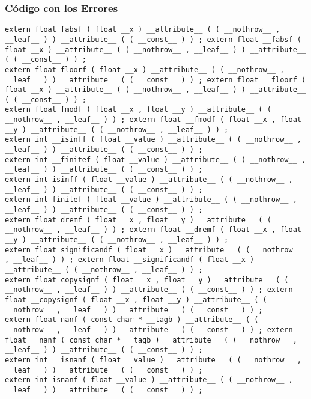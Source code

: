 \documentclass{beamer}
\begin{document}
\begin{frame}[fragile]
\frametitle{C\'odigo con los Errores}
\begin{verbatim}
extern float fabsf ( float __x ) __attribute__ ( ( __nothrow__ , __leaf__ ) ) __attribute__ ( ( __const__ ) ) ; extern float __fabsf ( float __x ) __attribute__ ( ( __nothrow__ , __leaf__ ) ) __attribute__ ( ( __const__ ) ) ; 
extern float floorf ( float __x ) __attribute__ ( ( __nothrow__ , __leaf__ ) ) __attribute__ ( ( __const__ ) ) ; extern float __floorf ( float __x ) __attribute__ ( ( __nothrow__ , __leaf__ ) ) __attribute__ ( ( __const__ ) ) ; 
extern float fmodf ( float __x , float __y ) __attribute__ ( ( __nothrow__ , __leaf__ ) ) ; extern float __fmodf ( float __x , float __y ) __attribute__ ( ( __nothrow__ , __leaf__ ) ) ; 
extern int __isinff ( float __value ) __attribute__ ( ( __nothrow__ , __leaf__ ) ) __attribute__ ( ( __const__ ) ) ; 
extern int __finitef ( float __value ) __attribute__ ( ( __nothrow__ , __leaf__ ) ) __attribute__ ( ( __const__ ) ) ; 
extern int isinff ( float __value ) __attribute__ ( ( __nothrow__ , __leaf__ ) ) __attribute__ ( ( __const__ ) ) ; 
extern int finitef ( float __value ) __attribute__ ( ( __nothrow__ , __leaf__ ) ) __attribute__ ( ( __const__ ) ) ; 
extern float dremf ( float __x , float __y ) __attribute__ ( ( __nothrow__ , __leaf__ ) ) ; extern float __dremf ( float __x , float __y ) __attribute__ ( ( __nothrow__ , __leaf__ ) ) ; 
extern float significandf ( float __x ) __attribute__ ( ( __nothrow__ , __leaf__ ) ) ; extern float __significandf ( float __x ) __attribute__ ( ( __nothrow__ , __leaf__ ) ) ; 
extern float copysignf ( float __x , float __y ) __attribute__ ( ( __nothrow__ , __leaf__ ) ) __attribute__ ( ( __const__ ) ) ; extern float __copysignf ( float __x , float __y ) __attribute__ ( ( __nothrow__ , __leaf__ ) ) __attribute__ ( ( __const__ ) ) ; 
extern float nanf ( const char * __tagb ) __attribute__ ( ( __nothrow__ , __leaf__ ) ) __attribute__ ( ( __const__ ) ) ; extern float __nanf ( const char * __tagb ) __attribute__ ( ( __nothrow__ , __leaf__ ) ) __attribute__ ( ( __const__ ) ) ; 
extern int __isnanf ( float __value ) __attribute__ ( ( __nothrow__ , __leaf__ ) ) __attribute__ ( ( __const__ ) ) ; 
extern int isnanf ( float __value ) __attribute__ ( ( __nothrow__ , __leaf__ ) ) __attribute__ ( ( __const__ ) ) ; 
\end{verbatim}
\end{frame}
\end{document}
